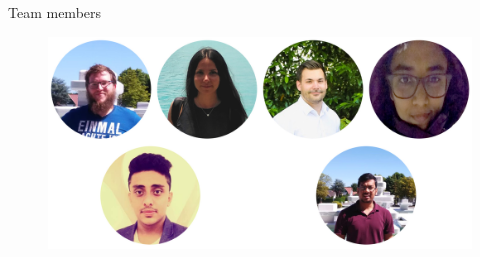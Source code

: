 \begin{frame}{Team members}

\begin{figure}[htbp]
	\centering
	\includegraphics[width=1\textwidth]{figures/SecondSemester}
\end{figure}

\end{frame}